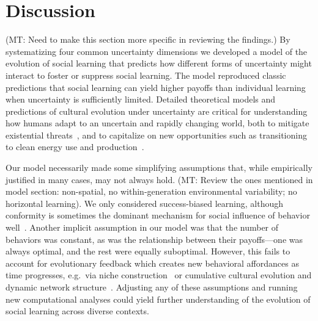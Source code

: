 \documentclass[letterpaper,11.5pt]{scrartcl}
\newcommand{\mt}[1]{{\textcolor{myorange} {({\tiny MT:} #1)}}}
\begin{document}
\section{Discussion}

\mt{Need to make this section more specific in reviewing the findings.} By
systematizing four common uncertainty dimensions we developed a model of the
evolution of social learning that predicts how different forms of uncertainty might
interact to foster or suppress social learning.  The model reproduced classic
predictions that social learning can yield higher payoffs than individual learning
when uncertainty is sufficiently limited.  
Detailed theoretical
models and predictions of cultural evolution under uncertainty are critical for
understanding how humans adapt to an uncertain and rapidly changing world, both to
mitigate existential threats~\cite{Moya2020,Jones2021}, and to capitalize on new
opportunities such as transitioning to clean energy use and
production~\cite{NatureEnergyEditorialPromisesPremises2018,Brisbois2022}.


Our model necessarily made some simplifying assumptions that, while
empirically justified in many cases, may not always hold.
\mt{Review the ones mentioned in model section: non-spatial, no within-generation
environmental variability; no horizontal learning}.
We only considered
success-biased learning, although conformity is sometimes the dominant mechanism 
for social influence of behavior well~\cite{Muthukrishna2016a,Smaldino2018b}. 
Another implicit assumption
in our model was that the number of behaviors was constant, as was the relationship
between their payoffs---one was always optimal, and the rest were equally
suboptimal. However, this fails to account for evolutionary feedback which creates
new behavioral affordances as time progresses, e.g.\ via niche 
construction~\cite{Smaldino2012,Heras-Escribano2020} or cumulative cultural
evolution and dynamic network structure~\cite{Smolla2019,Derex2020}. 
Adjusting any of these assumptions and running new computational analyses could
yield further understanding of the evolution of social learning across diverse
contexts.
\end{document}
